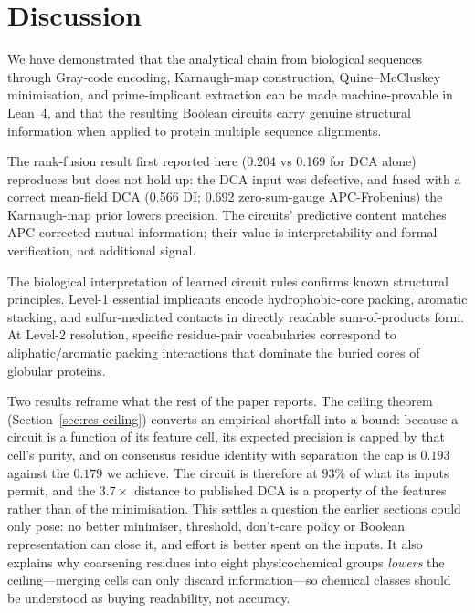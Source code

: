 \section{Discussion}
\label{sec:discussion}

We have demonstrated that the analytical chain from biological sequences
through Gray-code encoding, Karnaugh-map construction, Quine--McCluskey
minimisation, and prime-implicant extraction can be made machine-provable in
Lean~4, and that the resulting Boolean circuits carry genuine structural
information when applied to protein multiple sequence alignments.

The rank-fusion result first reported here (0.204 vs 0.169 for DCA alone)
reproduces but does not hold up: the DCA input was defective, and fused with
a correct mean-field DCA (0.566 DI; 0.692 zero-sum-gauge APC-Frobenius) the
Karnaugh-map prior lowers precision.  The circuits' predictive content
matches APC-corrected mutual information; their value is interpretability
and formal verification, not additional signal.

The biological interpretation of learned circuit rules confirms known
structural principles.  Level-1 essential implicants encode hydrophobic-core
packing, aromatic stacking, and sulfur-mediated contacts in directly readable
sum-of-products form.  At Level-2 resolution, specific residue-pair
vocabularies correspond to aliphatic/aromatic packing interactions that
dominate the buried cores of globular proteins.

Two results reframe what the rest of the paper reports.  The ceiling theorem
(Section~\ref{sec:res-ceiling}) converts an empirical shortfall into a bound:
because a circuit is a function of its feature cell, its expected precision is
capped by that cell's purity, and on consensus residue identity with separation
the cap is $0.193$ against the $0.179$ we achieve.  The circuit is therefore at
$93\%$ of what its inputs permit, and the $3.7\times$ distance to published DCA
is a property of the features rather than of the minimisation.  This settles a
question the earlier sections could only pose: no better minimiser, threshold,
don't-care policy or Boolean representation can close it, and effort is better
spent on the inputs.  It also explains why coarsening residues into eight
physicochemical groups \emph{lowers} the ceiling---merging cells can only
discard information---so chemical classes should be understood as buying
readability, not accuracy.

